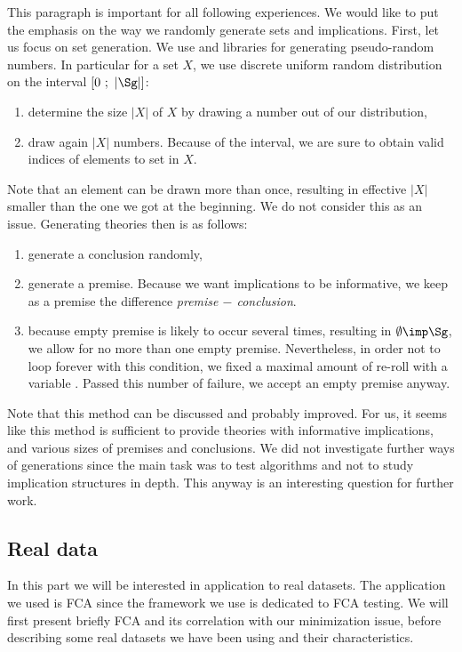 This paragraph is important for all following experiences.
We would like to put the emphasis on the way we randomly generate sets and 
implications. First, let us focus on set generation. We use  
and  libraries for generating pseudo-random numbers. In particular 
for a set $X$, we use discrete uniform random distribution on the interval 
$\lbrack 0 \ ; \ |\Sg| \rbrack$:
\begin{enumerate}
	\item determine the size $|X|$ of $X$ by drawing a number out of our 
	distribution,
	\item draw again $|X|$ numbers. Because of the interval, we are sure to
	obtain valid indices of elements to set in $X$.
\end{enumerate}
\noindent Note that an element can be drawn more than once, resulting in 
effective $|X|$ smaller than the one we got at the beginning. We do not consider
this as an issue. Generating theories then is as follows:
\begin{enumerate}
	\item generate a conclusion randomly,
	\item generate a premise. Because we want implications to be informative,
	we keep as a premise the difference \textit{premise $-$ conclusion}.
	\item because empty premise is likely to occur several times, resulting in
	$\emptyset \imp \Sg$, we allow for no more than one empty premise. 
	Nevertheless, in order not to loop forever with this condition, we fixed
	a maximal amount of re-roll with a variable . Passed this 
	number of failure, we accept an empty premise anyway.
\end{enumerate}
\noindent Note that this method can be discussed and probably improved. For us,
it seems like this method is sufficient to provide theories with informative
implications, and various sizes of premises and conclusions. We did not investigate further ways of generations since the main task was to test algorithms and not to study implication structures in depth. This anyway is an interesting question for further work.

\subsection{Real data}

In this part we will be interested in application to real datasets. The application we used is FCA since the framework we use is dedicated to FCA
testing. We will first present briefly FCA and its correlation with our
minimization issue, before describing some real datasets we have been using
and their characteristics.

